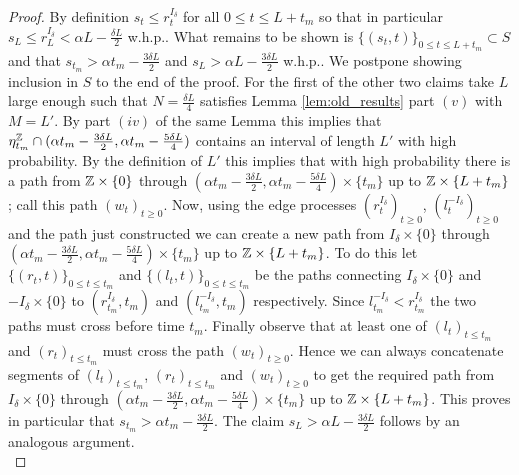 \begin{proof}
By definition $s_t \leq r^{I_\delta}_t$ for all $0 \leq t \leq L + t_m$ so that in particular $s_L \leq r^{I_\delta}_L < \alpha L - \frac{\delta L}{2}$ w.h.p.. What remains to be shown is $\{(s_t, t)\}_{0 \leq t \leq L + t_m} \subset S$  and that $s_{t_m} > \alpha t_m - \frac{3 \delta L }{2}$ and $s_L > \alpha L - \frac{3 \delta L}{2}$ w.h.p.. We postpone showing inclusion in $S$ to the end of the proof. For the first of the other two claims take $L$ large enough such that $N = \frac{\delta L}{4}$ satisfies Lemma \ref{lem:old_results} part $(v)$ with $M = L'$. By part $(iv)$ of the same Lemma this implies that $\eta^{\mathbb{Z}}_{t_m} \cap (\alpha t_m - \frac{3 \delta L}{2}, \alpha t_m - \frac{5 \delta L}{4})$ contains an interval of length $L'$ with high probability. By the definition of $L'$ this implies that with high probability there is a path from $\mathbb{Z} \times \{0\}$ through $(\alpha t_m - \frac{3 \delta L}{2}, \alpha t_m - \frac{5 \delta L}{4}) \times \{t_m\}$ up to $\mathbb{Z} \times \{ L + t_m \}$; call this path $(w_t)_{t \geq 0}$. Now, using the edge processes $(r^{I_\delta}_t)_{t \geq 0}$, $(l^{- I_\delta}_t)_{t \geq 0}$ and the path just constructed we can create a new path from $I_\delta \times \{ 0 \}$ through $(\alpha t_m - \frac{ 3 \delta L}{2}, \alpha t_m - \frac{5 \delta L}{4}) \times \{t_m\}$ up to $\mathbb{Z} \times \{ L + t_m \}$. To do this let $\{(r_t, t)\}_{0 \leq t \leq t_m}$ and $\{(l_t, t)\}_{0 \leq t \leq t_m}$ be the paths connecting $I_\delta \times \{0\}$ and $-I_\delta \times \{0\}$ to $(r^{I_\delta}_{t_m}, t_m)$ and $(l^{-I_\delta}_{t_m}, t_m)$ respectively. Since $l^{-I_\delta}_{t_m} < r^{I_\delta}_{t_m}$ the two paths must cross before time $t_m$. Finally observe that at least one of $(l_t)_{t \leq t_m}$ and $(r_t)_{t \leq t_m}$ must cross the path $(w_t)_{t \geq 0}$. Hence we can always concatenate segments of $(l_t)_{t \leq t_m}$, $(r_t)_{t \leq t_m}$ and $(w_t)_{t \geq 0}$ to get the required path from $I_\delta \times \{0\}$ through $(\alpha t_m - \frac{ 3 \delta L}{2}, \alpha t_m - \frac{5 \delta L}{4}) \times \{t_m\}$ up to $\mathbb{Z} \times \{ L + t_m \}$. This proves in particular that $s_{t_m} > \alpha t_m - \frac{3 \delta L }{2}$. The claim $s_L > \alpha L - \frac{3 \delta L}{2}$ follows by an analogous argument. \\


\end{proof}
